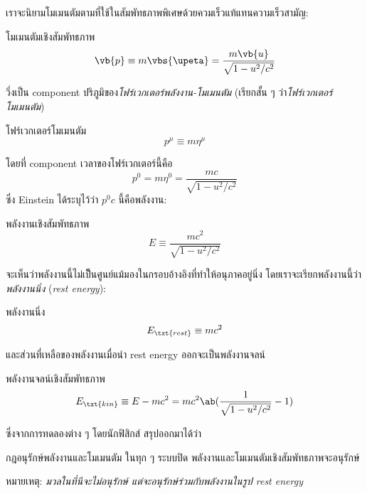 เราจะนิยามโมเมนตัมตามที่ใช้ในสัมพัทธภาพพิเศษด้วยควมเร็วแท้แทนความเร็วสามัญ:
\begin{defbox}{โมเมนตัมเชิงสัมพัทธภาพ}
    \begin{equation}
        \vb{p} \equiv m\vbs{\upeta} = \frac{m\vb{u}}{\sqrt{1-u^2/c^2}}\label{relmomentum}
    \end{equation}
\end{defbox}
วึ่งเป็น component ปริภูมิของ\emph{โฟร์เวกเตอร์พลังงาน-โมเมนตัม} (เรียกสั้น ๆ ว่า\emph{โฟร์เวกเตอร์โมเมนตัม})
\begin{defbox}{โฟร์เวกเตอร์โมเมนตัม}
    \begin{equation}
        p^\mu \equiv m\eta^\mu
    \end{equation}
\end{defbox}
โดยที่ component เวลาของโฟร์เวกเตอร์นี้คือ
\begin{equation}
    p^0 = m\eta^0 = \frac{mc}{\sqrt{1 - u^2/c^2}}
\end{equation}
ซึ่ง Einstein ได้ระบุไว้ว่า $p^0 c$ นี้คือพลังงาน:
\begin{defbox}{พลังงานเชิงสัมพัทธภาพ}
    \begin{equation}
        E \equiv \frac{mc^2}{\sqrt{1 - u^2/c^2}}\label{relenergy}
    \end{equation}
\end{defbox}
จะเห็นว่าพลังงานนี้ไม่เป็็นศูนย์แม้มองในกรอบอ้างอิงที่ทำให้อนุภาคอยู่นิ่ง โดยเราจะเรียกพลังงานนี้ว่า\emph{พลังงานนิ่ง} (\emph{rest energy}):
\begin{defbox}{พลังงานนิ่ง}
    \begin{equation}
        E_\txt{rest} \equiv mc^2
    \end{equation}
\end{defbox}
และส่วนที่เหลือของพลังงานเมื่อนำ rest energy ออกจะเป็นพลังงานจลน์
\begin{defbox}{พลังงานจลน์เชิงสัมพัทธภาพ}
    \begin{equation}
        E_\txt{kin} \equiv E - mc^2 = mc^2\ab(\frac{1}{\sqrt{1 - u^2/c^2}} - 1)
    \end{equation}
\end{defbox}

ซึ่งจากการทดลองต่าง ๆ โดยนักฟิสิกส์ สรุปออกมาได้ว่า
\begin{lawbox}{กฎอนุรักษ์พลังงานและโมเมนตัม}
    ในทุก ๆ ระบบปิด พลังงานและโมเมนตัมเชิงสัมพัทธภาพจะอนุรักษ์
\end{lawbox}
หมายเหตุ: \emph{มวลในที่นีจะไม่อนุรักษ์ แต่จะอนุรักษ์ร่วมกับพลังงานในรูป rest energy}

